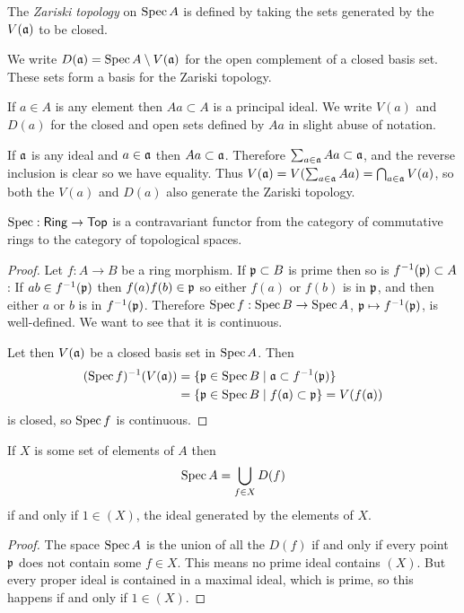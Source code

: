 \begin{defi}
The \emph{Zariski topology} on $\operatorname{Spec} A$ is defined by taking the sets generated by the $V(\mathfrak{a})$ to be closed.
\end{defi}

We write $D(\mathfrak{a}) = \operatorname{Spec} A \setminus V(\mathfrak{a})$ for the open complement of a closed basis set.
These sets form a basis for the Zariski topology.

If $a \in A$ is any element then $Aa \subset A$ is a principal ideal.
We write $V(a)$ and $D(a)$ for the closed and open sets defined by $Aa$ in slight abuse of notation.

If $\mathfrak{a}$ is any ideal and $a \in \mathfrak{a}$ then $Aa \subset \mathfrak{a}$.
Therefore $\sum_{a \in \mathfrak{a}} Aa \subset \mathfrak{a}$, and the reverse inclusion is clear so we have equality.
Thus $V(\mathfrak{a}) = V(\sum_{a \in \mathfrak{a}} Aa) = \bigcap_{a \in \mathfrak{a}} V(a)$, so both the $V(a)$ and $D(a)$ also generate the Zariski topology.


\begin{prop}
$\operatorname{Spec} : \mathsf{Ring} \to \mathsf{Top}$ is a contravariant functor from the category of commutative rings to the category of topological spaces.
\end{prop}

\begin{proof}
Let $f : A \to B$ be a ring morphism.
If $\mathfrak{p} \subset B$ is prime then so is $f^{-1}(\mathfrak{p}) \subset A$:
If $a b \in f^{-1}(\mathfrak{p})$ then $f(a) f(b) \in \mathfrak{p}$ so either $f(a)$ or $f(b)$ is in $\mathfrak{p}$, and then either $a$ or $b$ is in $f^{-1}(\mathfrak{p})$.
Therefore $\operatorname{Spec} f: \operatorname{Spec} B \to \operatorname{Spec} A$, $\mathfrak{p} \mapsto f^{-1}(\mathfrak{p})$, is well-defined.
We want to see that it is continuous.

Let then $V(\mathfrak{a})$ be a closed basis set in $\operatorname{Spec} A$.
Then
\begin{align*}
(\operatorname{Spec} f)^{-1}(V(\mathfrak{a}))
&= \{ \mathfrak{p} \in \operatorname{Spec} B \mid \mathfrak{a} \subset f^{-1}(\mathfrak{p}) \}
\\
&= \{ \mathfrak{p} \in \operatorname{Spec} B \mid f(\mathfrak{a}) \subset \mathfrak{p} \}
= V(f(\mathfrak{a}))
\end{align*}
is closed, so $\operatorname{Spec} f$ is continuous.
\end{proof}


\begin{prop}
If $X$ is some set of elements of $A$ then
\[
\operatorname{Spec} A = \bigcup_{f \in X} D(f)
\]
if and only if $1 \in (X)$, the ideal generated by the elements of $X$.
\end{prop}

\begin{proof}
The space $\operatorname{Spec} A$ is the union of all the $D(f)$ if and only if every point $\mathfrak{p}$ does not contain some $f \in X$.
This means no prime ideal contains $(X)$.
But every proper ideal is contained in a maximal ideal, which is prime, so this happens if and only if $1 \in (X)$.
\end{proof}

